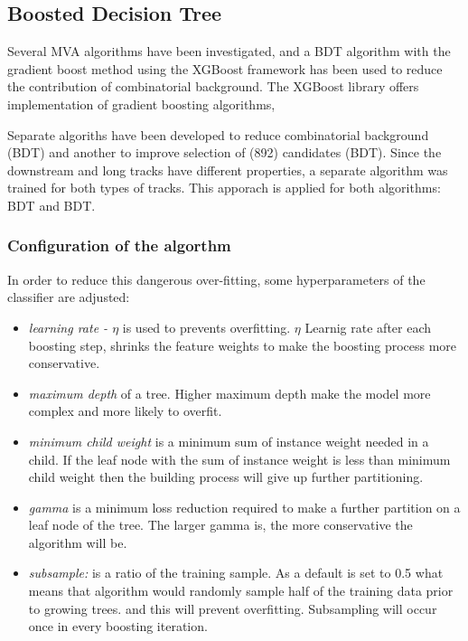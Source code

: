 \subsection{Boosted Decision Tree}

 Several MVA algorithms have been investigated, and a BDT algorithm with the gradient boost method using the  XGBoost framework \cite{XGBOOST} has been used to reduce the contribution of combinatorial background. The XGBoost library offers implementation of gradient boosting algorithms,
 
 Separate algoriths have been developed to reduce combinatorial background (\Bs BDT) and another to improve selection of \Kstarm(892) candidates (\Kstarm BDT). Since the downstream and long tracks have different properties, a separate algorithm was trained for both types of tracks. This apporach is applied for both algorithms: \Bs BDT and \Kstarm BDT.
 
\subsubsection{Configuration of the algorthm }

In order to reduce this dangerous over-fitting, some hyperparameters of the classifier
are adjusted:

\begin{itemize}
    \item \textit{learning rate - $\eta$} is used to prevents overfitting. $\eta$ 
    Learnig rate after each boosting step, shrinks the feature weights to make the boosting process more conservative.
    
    \item \textit{maximum depth} of a tree. Higher maximum depth make the model more complex and more likely to overfit. 
    
    \item \textit{minimum child weight} is a minimum sum of instance weight needed in a child. If the leaf node with the sum of instance weight is less than minimum child weight then the building process will give up further partitioning. 
    \item \textit{gamma} is a minimum loss reduction required to make a further partition on a leaf node of the tree. The larger gamma is, the more conservative the algorithm will be.
    
    \item \textit{subsample:} is a  ratio of the training sample. As a default is set to  0.5 what means that algorithm would randomly sample half of the training data prior to growing trees. and this will prevent overfitting. Subsampling will occur once in every boosting iteration.
    
\end{itemize}

